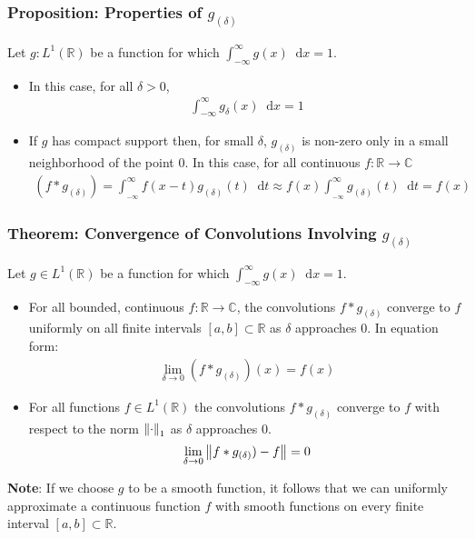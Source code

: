 \documentclass[11pt, a4paper]{article}
\newcommand{\diff}{\mathop{}\!\mathrm{d}} %
\newcommand{\R}{\mathbb{R}} %
\newcommand{\C}{\mathbb{C}} %
\begin{document}
\subsubsection{Proposition: Properties of $ g_{(\delta)} $}
Let $ g:L^1(\R) $ be a function for which $ \int_{-\infty}^{\infty}g(x) \diff x = 1 $.
\begin{itemize}
	\item In this case, for all $ \delta > 0 $,
	\begin{align*}
		\int_{-\infty}^{\infty}g_{\delta}(x) \diff x = 1
	\end{align*}

	\item If $ g $ has compact support then, for small $ \delta $, $ g_{(\delta)} $ is non-zero only in a small neighborhood of the point $ 0 $. In this case, for all continuous $ f:\R \to \C $
	\begin{align*}
		(f *g_{(\delta)}) = \int_{_{-\infty}}^{\infty}f(x-t)g_{(\delta)}(t) \diff t \approx f(x) \int_{_{-\infty}}^{\infty} g_{(\delta)}(t) \diff t = f(x)
	\end{align*}
\end{itemize}

\subsubsection{Theorem: Convergence of Convolutions Involving $ g_{(\delta)} $}
Let $ g \in L^1(\R) $ be a function for which $ \int_{-\infty}^{\infty}g(x) \diff x = 1 $.
\begin{itemize}
	\item For all bounded, continuous $ f:\R \to \C $, the convolutions $ f*g_{(\delta)} $ converge to $ f $ uniformly on all finite intervals $ [a, b] \subset \R $ as $ \delta $ approaches $ 0 $.
	In equation form:
	\begin{align*}
		\lim_{\delta \to 0}  ( f*g_{(\delta)})(x) = f(x)
	\end{align*}
	
	\item For all functions $ f \in L^1(\R) $ the convolutions $ f*g_{(\delta)} $ converge to $ f $ with respect to the norm $ \norm{\cdot}_{1} $ as $ \delta $ approaches $ 0 $. 
	\begin{align*}
		\lim_{\delta \to 0} \norm{f*g_{(\delta)}) - f} = 0
	\end{align*}
\end{itemize}

\textbf{Note}: If we choose $ g $ to be a smooth function, it follows that we can uniformly approximate a continuous function $ f $ with smooth functions on every finite interval $ [a, b] \subset \R $. 
\end{document}
